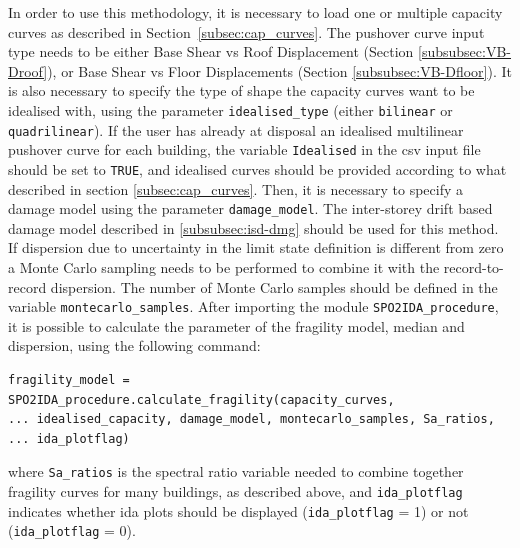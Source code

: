 In order to use this methodology, it is necessary to load one or multiple capacity curves as described in Section~\ref{subsec:cap_curves}. The pushover curve input type needs to be either Base Shear vs Roof Displacement (Section \ref{subsubsec:VB-Droof}), or Base Shear vs Floor Displacements (Section \ref{subsubsec:VB-Dfloor}). It is also necessary to specify the type of shape the capacity curves want to be idealised with, using the parameter \verb=idealised_type= (either \verb=bilinear= or \verb=quadrilinear=). If the user has already at disposal an idealised multilinear pushover curve for each building, the variable \verb=Idealised= in the csv input file should be set to \verb=TRUE=, and idealised curves should be provided according to what described in section \ref{subsec:cap_curves}. Then, it is necessary to specify a damage model using the parameter \verb=damage_model=. The inter-storey drift based damage model described in \ref{subsubsec:isd-dmg} should be used for this method.\\

If dispersion due to uncertainty in the limit state definition is different from zero a Monte Carlo sampling needs to be performed to combine it with the record-to-record dispersion. The number of Monte Carlo samples should be defined in the variable \verb=montecarlo_samples=.
After importing the module \verb=SPO2IDA_procedure=, it is possible to calculate the parameter of the fragility model, median and dispersion, using the following command:

\begin{Verbatim}[frame=single, commandchars=\\\{\}, samepage=true]
fragility_model = SPO2IDA_procedure.calculate_fragility(capacity_curves,
... idealised_capacity, damage_model, montecarlo_samples, Sa_ratios,
... ida_plotflag)
\end{Verbatim}

where \verb=Sa_ratios= is the spectral ratio variable needed to combine together fragility curves for many buildings, as described above, and \verb=ida_plotflag= indicates whether ida plots should be displayed (\verb=ida_plotflag= = 1) or not (\verb=ida_plotflag= = 0).